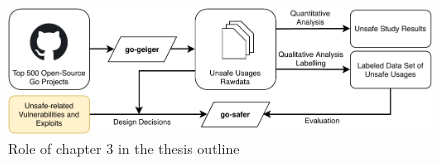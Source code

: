 \begin{figure}[ht]
    \includegraphics[width=\textwidth]{assets/figures/chapter3/outline3.pdf}
    \caption{Role of chapter 3 in the thesis outline}
    \label{fig:outline3}
\end{figure}
